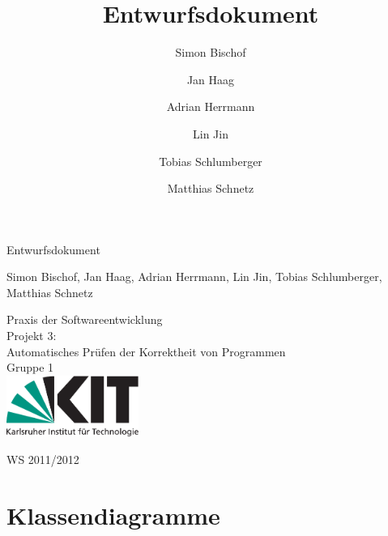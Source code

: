 \documentclass[10pt,a4paper,titlepage]{article}
\title{Entwurfsdokument}
\author{Simon Bischof \and Jan Haag \and Adrian Herrmann \and Lin Jin \and Tobias Schlumberger \and Matthias Schnetz}
\begin{document}
\thispagestyle {empty}
\vspace*{4cm}
\begin{center}
\begin {huge}
Entwurfsdokument\\
\end{huge}
Simon Bischof, Jan Haag, Adrian Herrmann, Lin Jin, Tobias Schlumberger, Matthias Schnetz\\
\vspace{3cm}
\begin{huge}
Praxis der Softwareentwicklung \\
Projekt 3:\\
Automatisches Pr\"{u}fen der Korrektheit von Programmen\\
Gruppe 1\\
\vspace{2cm}
\includegraphics[height=2cm]{images/Logo.pdf}\\[0.5cm]
\end{huge}
\begin{huge}
WS 2011/2012
\end{huge}
\end{center}
\newpage
\tableofcontents
\newpage

\section{Klassendiagramme}
\end{document}
